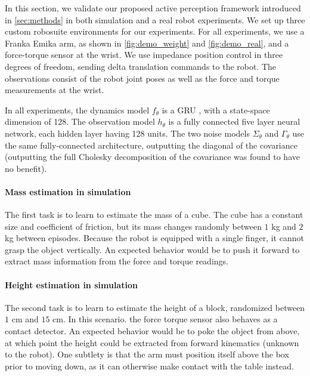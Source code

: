 \documentclass[anon]{l4dc2024}
\begin{document}
In this section, we validate our proposed active perception framework introduced in \autoref{sec:methods} in both  simulation and a real robot experiments.
We set up three custom robosuite \citep{robosuite2020} environments for our experiments.
For all experiments, we use a Franka Emika arm, as shown in \autoref{fig:demo_weight} and \autoref{fig:demo_real}, and a force-torque sensor at the wrist.
We use impedance position control in three degrees of freedom, sending delta translation commands to the robot.
The observations consist of the robot joint poses as well as the force and torque measurements at the wrist.

In all experiments, the dynamics model $f_\theta$ is a \acf{GRU} \citep{cho2014properties}, with a state-space dimension of 128.
The observation model $h_\theta$ is a fully connected five layer neural network, each hidden layer having 128 units.
The two noise models $\Sigma_\theta$ and $\Gamma_\theta$ use the same fully-connected architecture, outputting the diagonal of the covariance (outputting the full Cholesky decomposition of the covariance was found to have no benefit).

\paragraph{Mass estimation in simulation} The first task is to learn to estimate the mass of a cube. The cube has a constant size and coefficient of friction, but its mass changes randomly between $1$ kg and $2$ kg  between episodes. Because the robot is equipped with a single finger, it cannot grasp the object vertically. An expected behavior would be  to push it forward to extract mass information from the force and torque readings.

\paragraph{Height estimation in simulation}
The second task is to learn to estimate the height of a block, randomized between $1$ cm and $15$ cm.
In this scenario. the force torque sensor also behaves as a contact detector. An expected behavior would be to poke the object from above, at which point the height could be extracted from forward kinematics (unknown to the robot). One subtlety is that the arm must position itself above the box prior to moving down, as it can otherwise make contact with the table instead.
\end{document}
